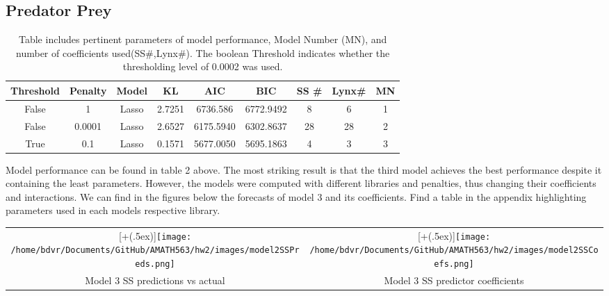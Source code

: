 \documentclass[12pt]{article}
\newcommand*{\addheight}[2][.5ex]{%
	\raisebox{0pt}[\dimexpr\height+(#1)\relax]{#2}%
}
\begin{document}
\subsection{Predator Prey }
	\begin{table}[H]
		\begin{center}
			\begin{tabular}{ccccccccc}
				\toprule
				Threshold & Penalty & Model & KL & AIC & BIC & SS \# & Lynx\#  & MN\\
				\midrule
				False & 1 & Lasso & 2.7251 &  6736.586 & 6772.9492 &8&6&1\\
				False & 0.0001 & Lasso & 2.6527 & 6175.5940 & 6302.8637&28&28&2 \\
				True &  0.1 & Lasso &  0.1571 &  5677.0050 & 5695.1863&4&3&3\\
				\bottomrule
			\end{tabular}
		
			\caption{Table includes pertinent parameters of model performance, Model Number (MN), and number of coefficients used(SS\#,Lynx\#). The boolean Threshold indicates whether the thresholding level of 0.0002 was used.}
		\end{center}
	\end{table}
\vspace*{-\baselineskip}
Model performance can be found in table 2 above. The most striking result is that the third model achieves the best performance despite it containing the least parameters. However, the models were computed with different libraries and penalties, thus changing their coefficients and interactions. We can find in the figures below the forecasts of model 3 and its coefficients. Find a table in the appendix highlighting parameters used in each models respective library.
\noindent
\begin{table}[H]
	\begin{center}
	\begin{tabular*}{1.08\linewidth}{|c|c|}
			\hline
			\addheight{\texttt{[image: /home/bdvr/Documents/GitHub/AMATH563/hw2/images/model2SSPreds.png]}} 
			&
			\addheight{\texttt{[image: /home/bdvr/Documents/GitHub/AMATH563/hw2/images/model2SSCoefs.png]}}\\
			\small Model 3 SS predictions vs actual &  			
			\small Model 3 SS predictor coefficients \\
			\hline
		\end{tabular*}
	\end{center}
\end{table}
\end{document}
